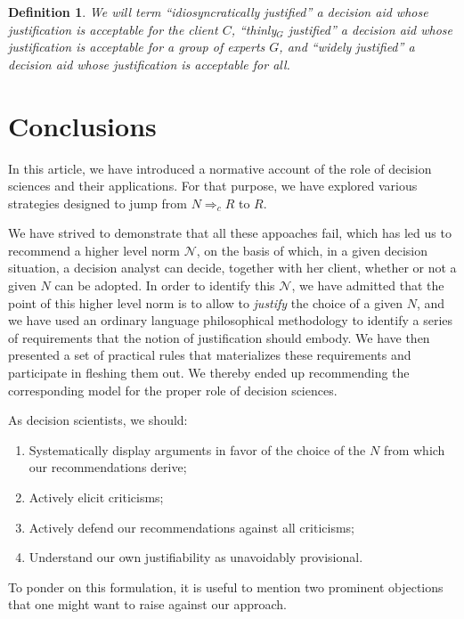 \documentclass[preprint, french, english, 11pt, authoryear]{elsarticle}%
\newtheorem{definition}{Definition}
\newcommand{\adv}{\mathscr{N}}
\begin{document}
\begin{definition}
We will term ``idiosyncratically justified'' a decision aid whose justification is acceptable for the client $C$, ``thinly$_G$ justified'' a decision aid whose justification is acceptable for a group of experts $G$, and ``widely justified'' a decision aid whose justification is acceptable for all.
\end{definition}

\section{Conclusions}
In this article, we have introduced a normative account of the role of decision sciences and their applications. For that purpose, we have explored various strategies designed  to jump from $N ⇒_c R$ to $R$.

We have strived to demonstrate that all these appoaches fail, which has led us to recommend a higher level norm $\adv$, on the basis of which, in a given decision situation, a decision analyst can decide, together with her client, whether or not a given $N$ can be adopted. In order to identify this $\adv$, we have admitted that the point of this higher level norm is to allow to \emph{justify} the choice of a given $N$, and we have used an ordinary language philosophical methodology to identify a series of requirements that the notion of justification should embody. We have then presented a set of practical rules that materializes these requirements and participate in fleshing them out. We thereby ended up recommending the corresponding model for the proper role of decision sciences.

As decision scientists, we should:
\begin{enumerate}[label=\roman*.]
	\item Systematically display arguments in favor of the choice of the $N$ from which our recommendations derive;
	\item Actively elicit criticisms;
	\item Actively defend our recommendations against all criticisms;
	\item Understand our own justifiability as unavoidably provisional.
\end{enumerate}

To ponder on this formulation, it is useful to mention two prominent objections that one might want to raise against our approach.
\end{document}
